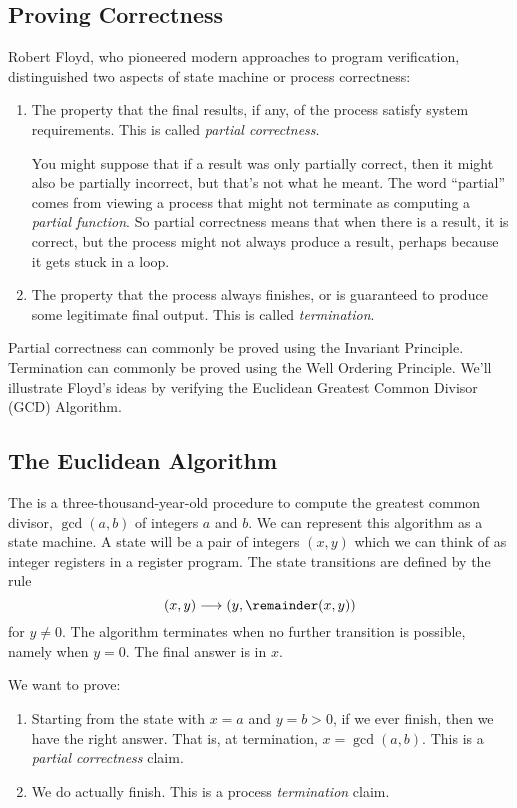 \subsection{Proving Correctness}

Robert Floyd, who pioneered modern approaches to program verification,
distinguished two aspects of state machine or process correctness:

\begin{enumerate}
\item The property that the final results, if any, of the process satisfy
system requirements.  This is called \emph{partial correctness}.

You might suppose that if a result was only partially correct, then it
might also be partially incorrect, but that's not what he meant.  The word
``partial'' comes from viewing a process that might not terminate as
computing a \emph{partial function}.  So partial correctness means that
when there is a result, it is correct, but the process might not always
produce a result, perhaps because it gets stuck in a loop.

\item The property that the process always finishes, or is guaranteed to
produce some legitimate final output.  This is called \emph{termination}.
\end{enumerate}

Partial correctness can commonly be proved using the Invariant Principle.
Termination can commonly be proved using the Well Ordering Principle.
We'll illustrate Floyd's ideas by verifying the Euclidean Greatest Common
Divisor (GCD) Algorithm.

\subsection{The Euclidean Algorithm}\label{euclid}

The  is a
three-thousand-year-old procedure to compute the greatest common divisor,
$\gcd(a,b)$ of integers $a$ and $b$.  We can represent this algorithm as a
state machine.  A state will be a pair of integers $(x,y)$ which we can
think of as integer registers in a register program.  The state
transitions are defined by the rule
\[
(x,y) \movesto (y, \remainder(x,y))
\]
for $y \neq 0$.  The algorithm terminates when no further transition is
possible, namely when $y=0$.  The final answer is in $x$.

We want to prove:
\begin{enumerate}
\item Starting from the state with $x = a$ and $y = b>0$, if we ever finish,
then we have the right answer.  That is, at termination, $x = \gcd(a,b)$.
This is a \emph{partial correctness} claim.

\item We do actually finish.  This is a process \emph{termination} claim.

\end{enumerate}

